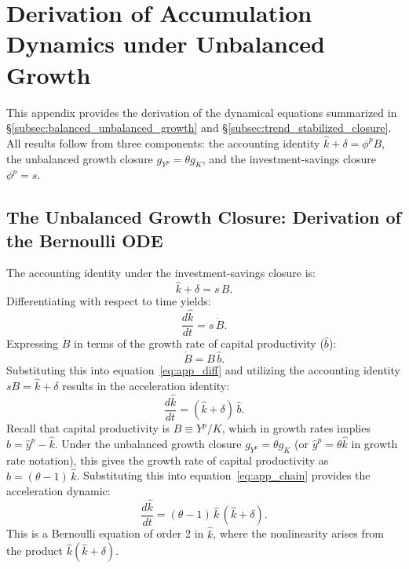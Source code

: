 \section{Derivation of Accumulation Dynamics under Unbalanced Growth}
\label{app:acc_dynamics}

This appendix provides the derivation of the dynamical equations summarized in \S\ref{subsec:balanced_unbalanced_growth} and \S\ref{subsec:trend_stabilized_closure}. All results follow from three components: the accounting identity $\hat{k} + \delta = \phi^p B$, the unbalanced growth closure $g_{Y^p} = \theta g_K$, and the investment-savings closure $\phi^p = s$.

\subsection{The Unbalanced Growth Closure: Derivation of the Bernoulli ODE}
\label{app:bernoulli}

The accounting identity under the investment-savings closure is:
\begin{equation}\label{eq:app_identity}
    \hat{k} + \delta = s \, B.
\end{equation}
Differentiating with respect to time yields:
\begin{equation}\label{eq:app_diff}
    \frac{d\hat{k}}{dt} = s \, \dot{B}.
\end{equation}
Expressing $\dot{B}$ in terms of the growth rate of capital productivity ($\hat{b}$):
\begin{equation}\label{eq:app_Bdot}
    \dot{B} = B \, \hat{b}.
\end{equation}
Substituting this into equation~\eqref{eq:app_diff} and utilizing the accounting identity $sB = \hat{k} + \delta$ results in the acceleration identity:
\begin{equation}\label{eq:app_chain}
    \frac{d\hat{k}}{dt} = (\hat{k} + \delta) \, \hat{b}.
\end{equation}
Recall that capital productivity is $B \equiv Y^p / K$, which in growth rates implies $\hat{b} = \hat{y}^p - \hat{k}$. Under the unbalanced growth closure $g_{Y^p} = \theta g_K$ (or $\hat{y}^p = \theta \hat{k}$ in growth rate notation), this gives the growth rate of capital productivity as $\hat{b} = (\theta - 1) \, \hat{k}$. Substituting this into equation~\eqref{eq:app_chain} provides the acceleration dynamic:
\begin{equation}\label{eq:app_bernoulli}
    \boxed{\frac{d\hat{k}}{dt} = (\theta - 1) \, \hat{k} \, (\hat{k} + \delta)}.
\end{equation}
This is a Bernoulli equation of order 2 in $\hat{k}$, where the nonlinearity arises from the product $\hat{k}(\hat{k} + \delta)$.

